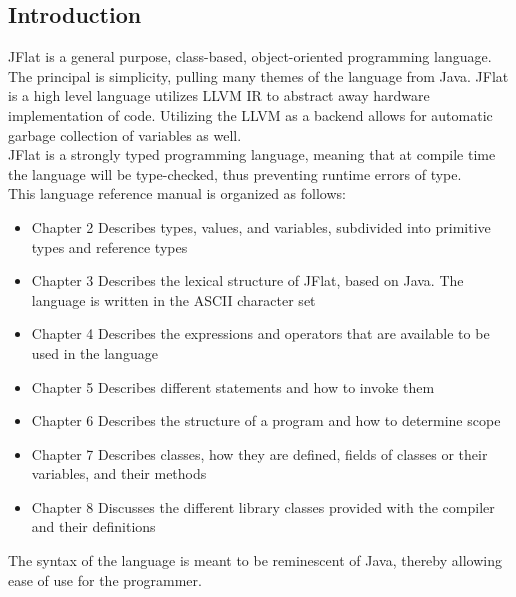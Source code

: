 \begin{homeworkProblem}
	\chapter{Introduction}
	JFlat is a general purpose, class-based, object-oriented programming language. The principal is simplicity, pulling many themes of the language from Java. JFlat is a high level language utilizes LLVM IR to abstract away hardware implementation of code. Utilizing the LLVM as a backend allows for automatic garbage collection of variables as well. \\
	JFlat is a strongly typed programming language, meaning that at compile time the language will be type-checked, thus preventing runtime errors of type. \\
	This language reference manual is organized as follows:\\
	\begin{itemize}
		\item Chapter 2 Describes types, values, and variables, subdivided into primitive types and reference types
		\item Chapter 3 Describes the lexical structure of JFlat, based on Java. The language is written in the ASCII character set
		\item Chapter 4 Describes the expressions and operators that are available to be used in the language
		\item Chapter 5 Describes different statements and how to invoke them
		\item Chapter 6 Describes the structure of a program and how to determine scope
		\item Chapter 7 Describes classes, how they are defined, fields of classes or their variables, and their methods
		\item Chapter 8 Discusses the different library classes provided with the compiler and their definitions
	\end{itemize}
	The syntax of the language is meant to be reminescent of Java, thereby allowing ease of use for the programmer. 
\end{homeworkProblem}
